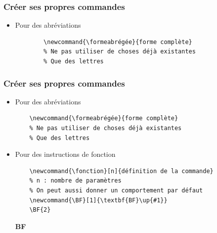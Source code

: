 \documentclass[handout]{beamer}
\begin{document}
\begin{frame}[fragile=singleslide]
	\frametitle{Créer ses propres commandes}
	\begin{itemize}
		\item Pour des abréviations\\
		\begin{verbatim}
		\newcommand{\formeabrégée}{forme complète}
		% Ne pas utiliser de choses déjà existantes
		% Que des lettres
		\end{verbatim}
	\end{itemize}
\end{frame}

\begin{frame}[fragile=singleslide]
\frametitle{Créer ses propres commandes}
\begin{itemize}
	\item Pour des abréviations\\
	\begin{verbatim}
	\newcommand{\formeabrégée}{forme complète}
	% Ne pas utiliser de choses déjà existantes
	% Que des lettres
	\end{verbatim}
	\item Pour des instructions de fonction\\
	\begin{verbatim}
	\newcommand{\fonction}[n]{définition de la commande}
	% n : nombre de paramètres 
	% On peut aussi donner un comportement par défaut
	\newcommand{\BF}[1]{\textbf{BF}\up{#1}}
	\BF{2}
	\end{verbatim}
	\newcommand{\BF}[1]{\textbf{BF}\up{#1}}
	\BF{2}
\end{itemize}
\end{frame}
\end{document}
